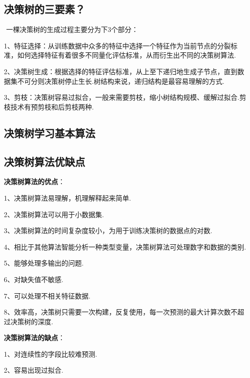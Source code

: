 \subsection{决策树的三要素？}\label{ux51b3ux7b56ux6811ux7684ux4e09ux8981ux7d20}

​ 一棵决策树的生成过程主要分为下3个部分：

​
1、特征选择：从训练数据中众多的特征中选择一个特征作为当前节点的分裂标准，如何选择特征有着很多不同量化评估标准，从而衍生出不同的决策树算法.

​
2、决策树生成：根据选择的特征评估标准，从上至下递归地生成子节点，直到数据集不可分则决策树停止生长.树结构来说，递归结构是最容易理解的方式.

​
3、剪枝：决策树容易过拟合，一般来需要剪枝，缩小树结构规模、缓解过拟合.剪枝技术有预剪枝和后剪枝两种.

\subsection{决策树学习基本算法}\label{ux51b3ux7b56ux6811ux5b66ux4e60ux57faux672cux7b97ux6cd5}

 

\subsection{决策树算法优缺点}\label{ux51b3ux7b56ux6811ux7b97ux6cd5ux4f18ux7f3aux70b9}

\textbf{决策树算法的优点}：

1、决策树算法易理解，机理解释起来简单.

2、决策树算法可以用于小数据集.

3、决策树算法的时间复杂度较小，为用于训练决策树的数据点的对数.

4、相比于其他算法智能分析一种类型变量，决策树算法可处理数字和数据的类别.

5、能够处理多输出的问题.

6、对缺失值不敏感.

7、可以处理不相关特征数据.

8、效率高，决策树只需要一次构建，反复使用，每一次预测的最大计算次数不超过决策树的深度.

\textbf{决策树算法的缺点}：

1、对连续性的字段比较难预测.

2、容易出现过拟合.

